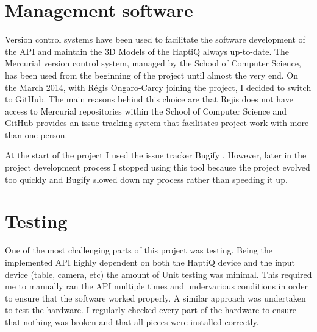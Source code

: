 \section{Management software}
Version control systems have been used to facilitate the software development of the API and maintain the 3D Models of the HaptiQ always up-to-date. The Mercurial version control system, managed by the School of Computer Science, has been used from the beginning of the project until almost the very end. On the  March 2014, with Régis Ongaro-Carcy joining the project, I decided to switch to GitHub. The main reasons behind this choice are that Rejis does not have access to Mercurial repositories within the School of Computer Science and GitHub provides an issue tracking system that facilitates project work with more than one person.  

At the start of the project I used the issue tracker Bugify \cite{bugify}. However, later in the project development process I stopped using this tool because the project evolved too quickly and Bugify slowed down my process rather than speeding it up. 

\section{Testing}
One of the most challenging parts of this project was testing. Being the implemented API highly dependent on both the HaptiQ device and the input device (table, camera, etc) the amount of Unit testing was minimal. This required me to manually ran the API multiple times and undervarious conditions in order to ensure that the software worked properly. A similar approach was undertaken to test the hardware. I regularly checked every part of the hardware to ensure that nothing was broken and that all pieces were installed correctly.